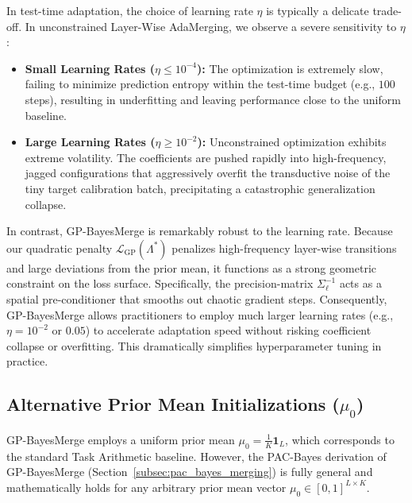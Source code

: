 \documentclass{article}
\theoremstyle{plain}
\theoremstyle{definition}
\theoremstyle{remark}
\begin{document}
In test-time adaptation, the choice of learning rate $\eta$ is typically a delicate trade-off. In unconstrained Layer-Wise AdaMerging, we observe a severe sensitivity to $\eta$:
\begin{itemize}
    \item \textbf{Small Learning Rates ($\eta \le 10^{-4}$):} The optimization is extremely slow, failing to minimize prediction entropy within the test-time budget (e.g., $100$ steps), resulting in underfitting and leaving performance close to the uniform baseline.
    \item \textbf{Large Learning Rates ($\eta \ge 10^{-2}$):} Unconstrained optimization exhibits extreme volatility. The coefficients are pushed rapidly into high-frequency, jagged configurations that aggressively overfit the transductive noise of the tiny target calibration batch, precipitating a catastrophic generalization collapse.
\end{itemize}
In contrast, GP-BayesMerge is remarkably robust to the learning rate. Because our quadratic penalty $\mathcal{L}_{\text{GP}}(\Lambda^*)$ penalizes high-frequency layer-wise transitions and large deviations from the prior mean, it functions as a strong geometric constraint on the loss surface. Specifically, the precision-matrix $\Sigma_{\ell}^{-1}$ acts as a spatial pre-conditioner that smooths out chaotic gradient steps. Consequently, GP-BayesMerge allows practitioners to employ much larger learning rates (e.g., $\eta = 10^{-2}$ or $0.05$) to accelerate adaptation speed without risking coefficient collapse or overfitting. This dramatically simplifies hyperparameter tuning in practice.

\subsection{Alternative Prior Mean Initializations ($\mu_0$)}

GP-BayesMerge employs a uniform prior mean $\mu_0 = \frac{1}{K} \mathbf{1}_L$, which corresponds to the standard Task Arithmetic baseline. However, the PAC-Bayes derivation of GP-BayesMerge (Section~\ref{subsec:pac_bayes_merging}) is fully general and mathematically holds for any arbitrary prior mean vector $\mu_0 \in [0, 1]^{L \times K}$. 
\end{document}
